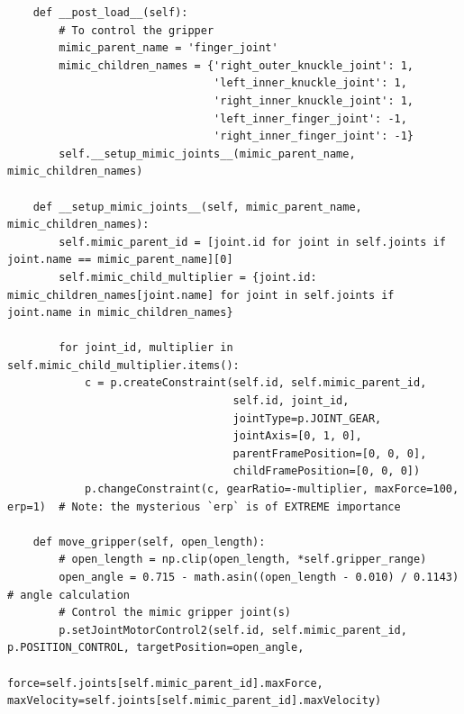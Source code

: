 \documentclass[11pt, a4paper]{report}
\begin{document}
\begin{lstlisting}
    def __post_load__(self):
        # To control the gripper
        mimic_parent_name = 'finger_joint'
        mimic_children_names = {'right_outer_knuckle_joint': 1,
                                'left_inner_knuckle_joint': 1,
                                'right_inner_knuckle_joint': 1,
                                'left_inner_finger_joint': -1,
                                'right_inner_finger_joint': -1}
        self.__setup_mimic_joints__(mimic_parent_name, mimic_children_names)

    def __setup_mimic_joints__(self, mimic_parent_name, mimic_children_names):
        self.mimic_parent_id = [joint.id for joint in self.joints if joint.name == mimic_parent_name][0]
        self.mimic_child_multiplier = {joint.id: mimic_children_names[joint.name] for joint in self.joints if joint.name in mimic_children_names}

        for joint_id, multiplier in self.mimic_child_multiplier.items():
            c = p.createConstraint(self.id, self.mimic_parent_id,
                                   self.id, joint_id,
                                   jointType=p.JOINT_GEAR,
                                   jointAxis=[0, 1, 0],
                                   parentFramePosition=[0, 0, 0],
                                   childFramePosition=[0, 0, 0])
            p.changeConstraint(c, gearRatio=-multiplier, maxForce=100, erp=1)  # Note: the mysterious `erp` is of EXTREME importance

    def move_gripper(self, open_length):
        # open_length = np.clip(open_length, *self.gripper_range)
        open_angle = 0.715 - math.asin((open_length - 0.010) / 0.1143)  # angle calculation
        # Control the mimic gripper joint(s)
        p.setJointMotorControl2(self.id, self.mimic_parent_id, p.POSITION_CONTROL, targetPosition=open_angle,
                                force=self.joints[self.mimic_parent_id].maxForce, maxVelocity=self.joints[self.mimic_parent_id].maxVelocity)
\end{lstlisting}
\end{document}
